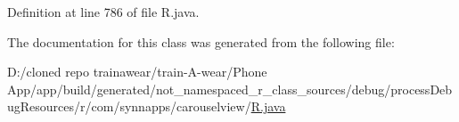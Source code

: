 Definition at line 786 of file R.\+java.



The documentation for this class was generated from the following file\+:\begin{DoxyCompactItemize}
\item 
D\+:/cloned repo trainawear/train-\/\+A-\/wear/\+Phone App/app/build/generated/not\+\_\+namespaced\+\_\+r\+\_\+class\+\_\+sources/debug/process\+Debug\+Resources/r/com/synnapps/carouselview/\mbox{\hyperlink{process_debug_resources_2r_2com_2synnapps_2carouselview_2_r_8java}{R.\+java}}\end{DoxyCompactItemize}
